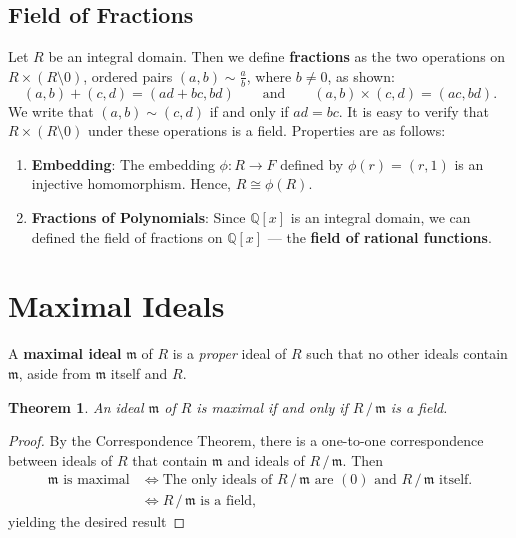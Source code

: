 \documentclass[11pt]{article}
\newtheorem{theorem}{Theorem}
\begin{document}

\subsection{Field of Fractions}

Let $R$ be an integral domain. Then we define \textbf{fractions} as the two operations on $R \times (R \setminus 0)$, ordered pairs $(a, b) \sim \tfrac{a}{b}$, where $b \ne 0$, as shown:
\[
  (a, b) + (c, d) = (ad + bc, bd) \qquad \text{and} \qquad (a, b) \times (c, d)=  (ac, bd).
\]
We write that $(a, b) \sim (c, d)$ if and only if $ad = bc$. It is easy to verify that $R \times (R \setminus 0)$ under these operations is a field. Properties are as follows:

\begin{enumerate}
  \item \textbf{Embedding}: The embedding $\phi : R \to F$ defined by $\phi(r) = (r, 1)$ is an injective homomorphism. Hence, $R \cong \phi(R)$.
  \item \textbf{Fractions of Polynomials}: Since $\mathbb{Q}[x]$ is an integral domain, we can defined the field of fractions on $\mathbb{Q}[x]$ --- the \textbf{field of rational functions}.
\end{enumerate}


\section{Maximal Ideals}

A \textbf{maximal ideal} $\mathfrak{m}$ of $R$ is a \textit{proper} ideal of $R$ such that no other ideals contain $\mathfrak{m}$, aside from $\mathfrak{m}$ itself and $R$.

\begin{adjustwidth}{0.5cm}{}
	\begin{theorem}
		An ideal $\mathfrak{m}$ of $R$ is maximal if and only if $R \,/\, \mathfrak{m}$ is a field.
	\end{theorem}
	\begin{proof}
		By the Correspondence Theorem, there is a one-to-one correspondence between ideals of $R$ that contain $\mathfrak{m}$ and ideals of $R \,/\, \mathfrak{m}$. Then
		\begin{align*}
			\mathfrak{m} \text{ is maximal} &\iff \text{The only ideals of $R \,/\, \mathfrak{m}$ are $(0)$ and $R \,/\, \mathfrak{m}$ itself.} \\
			&\iff R \,/\, \mathfrak{m} \text{ is a field},
		\end{align*}
		yielding the desired result
	\end{proof}
\end{adjustwidth}
\end{document}
